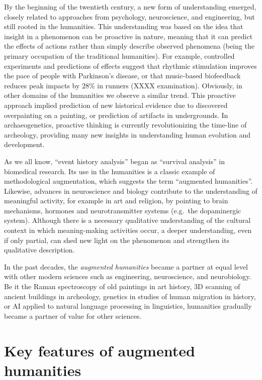 \documentclass[
]{book}
\theoremstyle{definition}
\theoremstyle{definition}
\theoremstyle{definition}
\theoremstyle{definition}
\theoremstyle{remark}
\begin{document}
By the beginning of the twentieth century, a new form of understanding emerged, closely related to approaches from psychology, neuroscience, and engineering, but still rooted in the humanities. This understanding was based on the idea that insight in a phenomenon can be proactive in nature, meaning that it can predict the effects of actions rather than simply describe observed phenomena (being the primary occupation of the traditional humanities).
For example, controlled experiments and predictions of effects suggest that rhythmic stimulation improves the pace of people with Parkinson's disease, or that music-based biofeedback reduces peak impacts by 28\% in runners (XXXX examination). Obviously, in other domains of the humanities we observe a similar trend. This proactive approach implied prediction of new historical evidence due to discovered overpainting on a painting, or prediction of artifacts in undergrounds. In archaeogenetics, proactive thinking is currently revolutionizing the time-line of archeology, providing many new insights in understanding human evolution and development.

As we all know, ``event history analysis'' began as ``survival analysis'' in biomedical research.
Its use in the humanities is a classic example of methodological augmentation, which suggests the term ``augmented humanities''.
Likewise, advances in neuroscience and biology contribute to the understanding of meaningful activity, for example in art and religion, by pointing to brain mechanisms, hormones and neurotransmitter systems (e.g.~the dopaminergic system). Although there is a necessary qualitative understanding of the cultural context in which meaning-making activities occur, a deeper understanding, even if only partial, can shed new light on the phenomenon and strengthen its qualitative description.

In the past decades, the \emph{augmented humanities} became a partner at equal level with other modern sciences such as engineering, neuroscience, and neurobiology. Be it the Raman spectroscopy of old paintings in art history, 3D scanning of ancient buildings in archeology, genetics in studies of human migration in history, or AI applied to natural language processing in linguistics, humanities gradually became a partner of value for other sciences.

\hypertarget{key-features-of-augmented-humanities}{%
\section{Key features of augmented humanities}\label{key-features-of-augmented-humanities}}
\end{document}

